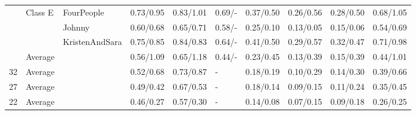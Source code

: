 \begin{tabular}{llllllllll}
 & Class E & FourPeople & 0.73/0.95 & 0.83/1.01 & 0.69/- & 0.37/0.50 & 0.26/0.56 & 0.28/0.50 & 0.68/1.05 \\
 &  & Johnny & 0.60/0.68 & 0.65/0.71 & 0.58/- & 0.25/0.10 & 0.13/0.05 & 0.15/0.06 & 0.54/0.69 \\
 &  & KristenAndSara & 0.75/0.85 & 0.84/0.83 & 0.64/- & 0.41/0.50 & 0.29/0.57 & 0.32/0.47 & 0.71/0.98 \\
 & Average &  & 0.56/1.09 & 0.65/1.18 & 0.44/- & 0.23/0.45 & 0.13/0.39 & 0.15/0.39 & 0.44/1.01 \\
32 & Average &  & 0.52/0.68 & 0.73/0.87 & - & 0.18/0.19 & 0.10/0.29 & 0.14/0.30 & 0.39/0.66 \\
27 & Average &  & 0.49/0.42 & 0.67/0.53 & - & 0.18/0.14 & 0.09/0.15 & 0.11/0.24 & 0.35/0.45 \\
22 & Average &  & 0.46/0.27 & 0.57/0.30 & - & 0.14/0.08 & 0.07/0.15 & 0.09/0.18 & 0.26/0.25 \\
\bottomrule
\end{tabular}
